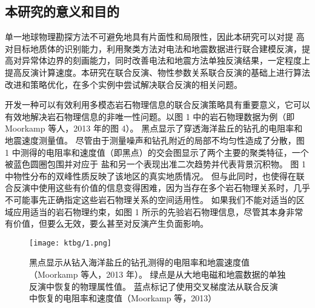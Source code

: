 \subsection{本研究的意义和目的}

单一地球物理勘探方法不可避免地具有片面性和局限性，因此本研究可以对提 高对目标地质体的识别能力，利用聚类方法对电法和地震数据进行联合建模反演，提高对异常体边界的刻画能力，同时改善电法和地震方法单独反演结果，一定程度上提高反演计算速度。本研究在联合反演、物性参数关系联合反演的基础上进行算法改进和策略优化，在多个实例中尝试解决联合反演的相关问题。

开发一种可以有效利用多模态岩石物理信息的联合反演策略具有重要意义，它可以有效地解决岩石物理信息的非唯一性问题。以图 1 中的岩石物理数据为例（即 Moorkamp 等人，2013 年的图 4）。 黑点显示了穿透海洋盐丘的钻孔的电阻率和地震速度测量值。 尽管由于测量噪声和钻孔附近的局部不均匀性造成了分散，图 1 中测得的电阻率和速度值（即黑点）的交会图显示了两个主要的聚类特征，一个被蓝色圆圈包围并对应于 盐和另一个表现出准二次趋势并代表背景沉积物。 图 1 中物性分布的双峰性质反映了该地区的真实地质情况。 但与此同时，也使得在联合反演中使用这些有价值的信息变得困难，因为当存在多个岩石物理关系时，几乎不可能事先正确指定这些岩石物理关系的空间适用性。 如果我们不能对适当的区域应用适当的岩石物理约束，如图 1 所示的先验岩石物理信息，尽管其本身非常有价值，但要么无效，要么甚至对反演产生负面影响。

\begin{figure}
    \centering
    \texttt{[image: ktbg/1.png]}
    \caption[]{黑点显示从钻入海洋盐丘的钻孔测得的电阻率和地震速度值（Moorkamp 等人，2013 年）。 绿点是从大地电磁和地震数据的单独反演中恢复的物理属性值。 蓝点标记了使用交叉梯度法从联合反演中恢复的电阻率和速度值（Moorkamp 等，2013）} \label{ktbg1}
\end{figure}
